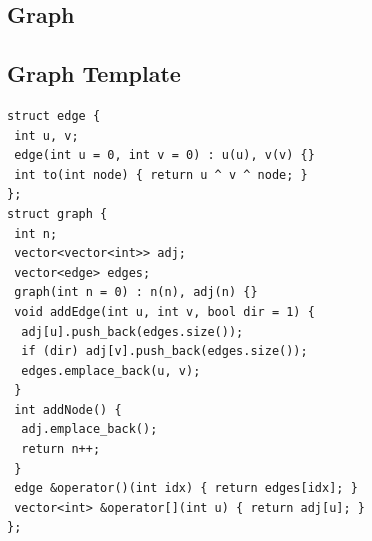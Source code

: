 \documentclass[a4paper,11pt,oneside]{article}
\begin{document}
\begin{multicols*}{\COLS}
\section{Graph}
\subsection{Graph Template}
\begin{lstlisting}
struct edge {
 int u, v;
 edge(int u = 0, int v = 0) : u(u), v(v) {}
 int to(int node) { return u ^ v ^ node; }
};
struct graph {
 int n;
 vector<vector<int>> adj;
 vector<edge> edges;
 graph(int n = 0) : n(n), adj(n) {}
 void addEdge(int u, int v, bool dir = 1) {
  adj[u].push_back(edges.size());
  if (dir) adj[v].push_back(edges.size());
  edges.emplace_back(u, v);
 }
 int addNode() {
  adj.emplace_back();
  return n++;
 }
 edge &operator()(int idx) { return edges[idx]; }
 vector<int> &operator[](int u) { return adj[u]; }
};
\end{lstlisting}

\end{multicols*}
\end{document}
